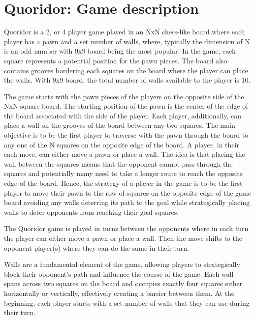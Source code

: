 \chapter{Quoridor: Game description}
\label{GameDescription}

Quoridor is a 2, or 4 player game played in an NxN chess-like board where each player has a pawn and a set number of walls, where, typically the dimension of N is an odd number with 9x9 board being the most popular. In the game, each square represents a potential position for the pawn pieces. The board also contains grooves bordering each squares on the board where the player can place the walls. With 9x9 board, the total number of walls available to the player is 10.

The game starts with the pawn pieces of the players on the opposite side of the NxN square board. The starting position of the pawn is the center of the edge of the board associated with the side of the player. Each player, additionally, can place a wall on the grooves of the board between any two squares. The main objective is to be the first player to traverse with the pawn through the board to any one of the N squares on the opposite edge of the board. A player, in their each move, can either move a pawn or place a wall. The idea is that placing the wall between the squares means that the opponent cannot pass through the squares and potentially many need to take a longer route to reach the opposite edge of the board. Hence, the strategy of a player in the game is to be the first player to move
their pawn to the row of squares on the opposite edge of the game board avoiding any walls deterring its path to the goal while strategically placing walls to deter opponents from reaching their goal squares.

The Quoridor game is played in turns between the opponents where in each turn the player can either move a pawn or place a wall. Then the move shifts to the opponent player(s) where they can do the same in their turn.

Walls are a fundamental element of the game, allowing players to strategically block their opponent's path and influence the course of the game. Each wall spans across two squares on the board and occupies exactly four squares either horizontally or vertically, effectively creating a barrier between them. At the beginning, each player starts
with a set number of walls that they can use during their turn.

